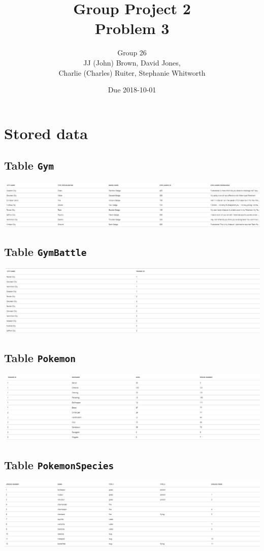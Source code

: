 \documentclass{article}
\title{Group Project 2\\Problem 3}
\author{Group 26\\JJ (John) Brown, David Jones,\\Charlie (Charles) Ruiter, Stephanie Whitworth}
\date{Due 2018-10-01}
\begin{document}
\maketitle

\section{Stored data}
 \subsection{Table \texttt{Gym}}
 \includegraphics[width=\textwidth]{img/query-outputs/3_Gym.JPG}
 \subsection{Table \texttt{GymBattle}}
 \includegraphics[width=\textwidth]{img/query-outputs/3_GymBattle.JPG}
 \subsection{Table \texttt{Pokemon}}
 \includegraphics[width=\textwidth]{img/query-outputs/3_Pokemon.JPG}
 \subsection{Table \texttt{PokemonSpecies}}
 \includegraphics[width=\textwidth]{img/query-outputs/3_PokemonSpecies.JPG}
\end{document}
